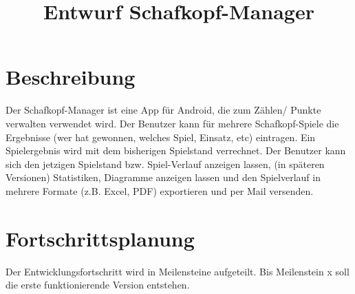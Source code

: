 \documentclass[10pt,a4paper]{article}
\begin{document}
	\title{Entwurf Schafkopf-Manager}
	\section{Beschreibung}
	Der Schafkopf-Manager ist eine App für Android, die zum Zählen/ Punkte verwalten verwendet wird. Der Benutzer kann für mehrere Schafkopf-Spiele die Ergebnisse (wer hat gewonnen, welches Spiel, Einsatz, etc) eintragen. Ein Spielergebnis wird mit dem bisherigen Spielstand verrechnet. Der Benutzer kann sich den jetzigen Spielstand bzw. Spiel-Verlauf anzeigen lassen, (in späteren Versionen) Statistiken, Diagramme anzeigen lassen und den Spielverlauf in mehrere Formate (z.B. Excel, PDF) exportieren und per Mail versenden.
	
	\section{Fortschrittsplanung}
	Der Entwicklungsfortschritt wird in Meilensteine aufgeteilt. Bis Meilenstein x soll die erste funktionierende Version entstehen.\\
	\\
\end{document}

